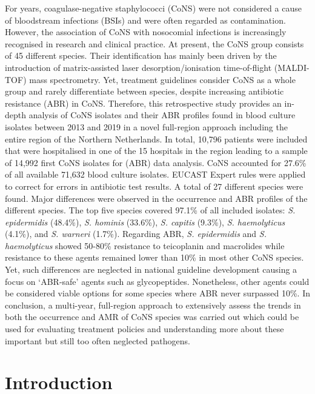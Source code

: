 \documentclass[
]{book}
\begin{document}
For years, coagulase-negative staphylococci (CoNS) were not considered a cause of bloodstream infections (BSIs) and were often regarded as contamination. However, the association of CoNS with nosocomial infections is increasingly recognised in research and clinical practice. At present, the CoNS group consists of 45 different species. Their identification has mainly been driven by the introduction of matrix-assisted laser desorption/ionisation time-of-flight (MALDI-TOF) mass spectrometry. Yet, treatment guidelines consider CoNS as a whole group and rarely differentiate between species, despite increasing antibiotic resistance (ABR) in CoNS. Therefore, this retrospective study provides an in-depth analysis of CoNS isolates and their ABR profiles found in blood culture isolates between 2013 and 2019 in a novel full-region approach including the entire region of the Northern Netherlands. In total, 10,796 patients were included that were hospitalised in one of the 15 hospitals in the region leading to a sample of 14,992 first CoNS isolates for (ABR) data analysis. CoNS accounted for 27.6\% of all available 71,632 blood culture isolates. EUCAST Expert rules were applied to correct for errors in antibiotic test results. A total of 27 different species were found. Major differences were observed in the occurrence and ABR profiles of the different species. The top five species covered 97.1\% of all included isolates: \emph{S. epidermidis} (48.4\%), \emph{S. hominis} (33.6\%), \emph{S. capitis} (9.3\%), \emph{S. haemolyticus} (4.1\%), and \emph{S. warneri} (1.7\%). Regarding ABR, \emph{S. epidermidis} and \emph{S. haemolyticus} showed 50-80\% resistance to teicoplanin and macrolides while resistance to these agents remained lower than 10\% in most other CoNS species. Yet, such differences are neglected in national guideline development causing a focus on `ABR-safe' agents such as glycopeptides. Nonetheless, other agents could be considered viable options for some species where ABR never surpassed 10\%. In conclusion, a multi-year, full-region approach to extensively assess the trends in both the occurrence and AMR of CoNS species was carried out which could be used for evaluating treatment policies and understanding more about these important but still too often neglected pathogens.

\hypertarget{introduction-4}{%
\section{Introduction}\label{introduction-4}}
\end{document}
